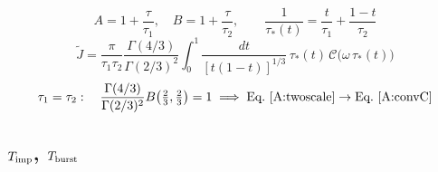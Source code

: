 \documentclass[10pt,prd,aps,nobibnotes,superscriptaddress,preprintnumbers,notitlepage]{revtex4-1}
\begin{document}
\begin{equation}
  A=1+\frac{\tau}{\tau_1},\quad B=1+\frac{\tau}{\tau_2},
  \qquad
  \frac{1}{\tau_\ast(t)}=\frac{t}{\tau_1}+\frac{1-t}{\tau_2}
  \label{A:taustar}
\end{equation}
\begin{equation}
  \tilde J=\frac{\pi}{\tau_1\tau_2}\frac{\Gamma(4/3)}{\Gamma(2/3)^2}
  \!\int_0^1\!\frac{dt}{[t(1-t)]^{1/3}}\,\tau_\ast(t)\,\mathcal{C}\bigl(\omega\,\tau_\ast(t)\bigr)
  \label{A:twoscale}
\end{equation}
\begin{equation}
  \tau_1=\tau_2:\quad
  \frac{\Gamma(4/3)}{\Gamma(2/3)^2}B\bigl(\tfrac23,\tfrac23\bigr)=1
  \;\Longrightarrow\;
  \text{Eq.~\eqref{A:twoscale}}\to\text{Eq.~\eqref{A:convC}}
  \label{A:twoscalecheck}
\end{equation}

\subsection{\texorpdfstring{$T_{\rm imp}$, $T_{\rm burst}$}{T\_imp, T\_burst}}
\label{sec:chain-impulsive}
\end{document}

